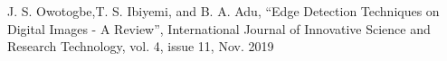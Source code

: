 \documentclass[conference]{IEEEtran}
\begin{document}
\begin{thebibliography}{00}

 J. S. Owotogbe,T. S. Ibiyemi, and B. A. Adu, ``Edge Detection Techniques on Digital Images - A Review'', International Journal of Innovative Science and Research Technology, vol. 4, issue 11, Nov. 2019

\end{thebibliography}






\end{document}
